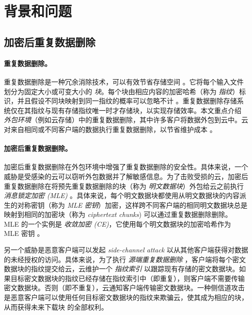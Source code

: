\section{背景和问题}
\label{sec:featurespy-background}

\subsection{加密后重复数据删除}
\label{subsec:featurespy-basics}

\paragraph*{重复数据删除。}
重复数据删除是一种冗余消除技术，可以有效节省存储空间 \cite{wallace12, meyer11}。它将每个输入文件划分为固定大小或可变大小的 {\em 块}。每个块由相应内容的加密哈希（称为 {\em 指纹}）标识，并且假设不同块映射到同一指纹的概率可以忽略不计 \cite{black06}。重复数据删除存储系统仅在其指纹与现有存储指纹唯一时才存储块，以实现存储效率。本文重点介绍 {\em 外包环境}（例如云存储）中的重复数据删除，其中许多客户将数据外包到云中。云对来自相同或不同客户端的数据执行重复数据删除，以节省维护成本 \cite{harnik10}。


\paragraph*{加密后重复数据删除。}
加密后重复数据删除在外包环境中增强了重复数据删除的安全性。具体来说，一个威胁是受感染的云可以窃听外包数据并了解敏感信息。为了击败受损的云，加密后重复数据删除在将预先重复数据删除的块（称为 {\em 明文数据块}）外包给云之前执行 {\em 消息锁定加密 (MLE)} \cite{bellare2013MLE, bellare13b}。具体来说，每个明文数据块都使用从明文数据块的内容派生的对称密钥（称为 {\em MLE 密钥}）加密，这样跨不同客户端的相同明文数据块总是映射到相同的加密块（称为 {\em ciphertext chunks}) 可以通过重复数据删除删除。 MLE 的一个实例是 {\em 收敛加密 (CE)}，它使用每个明文数据块的加密哈希作为 MLE 密钥 \cite{douceur02}。

另一个威胁是恶意客户端可以发起 {\em side-channel attack} \cite{harnik10, halevi11} 以从其他客户端获得对数据的未经授权的访问。具体来说，为了执行 {\em 源端重复数据删除} \cite{harnik10}，客户端将每个密文数据块的指纹提交给云，云维护一个 {\em 指纹索引} 以跟踪现有存储的密文数据块。如果目标密文数据块的指纹已经存储在指纹索引中（即重复），则客户端不需要传输密文数据块。否则（即不重复），云通知客户端传输密文数据块。一种侧信道攻击 \cite{mulazzani11, halevi11} 是恶意客户端可以使用任何目标密文数据块的指纹来欺骗云，使其成为相应的块，从而获得未来下载块 \cite{mulazzani11} 的全部权利。


